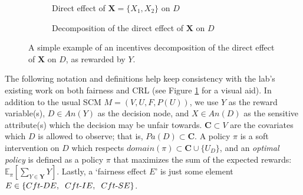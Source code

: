 \documentclass[letterpaper,10pt]{article}
\begin{document}
\begin{figure}
\centering
\begin{subfigure}{.5\textwidth}
  \centering
  \caption{Direct effect of $\mathbf{X}=\{X_1,X_2\}$ on $D$}
  \label{fig:direct}
\end{subfigure}%
\begin{subfigure}{.5\textwidth}
  \centering
  \caption{Decomposition of the direct effect of $\mathbf{X}$ on $D$}
  \label{fig:decomp}
\end{subfigure}
\caption{A simple example of an incentives decomposition of the direct effect of $\mathbf{X}$ on $D$, as rewarded by $Y$.}
\label{fig:simple}
\end{figure}

The following notation and definitions help keep consistency with the lab's existing work on both fairness\cite{r30} and CRL \cite{r57} (see Figure \ref{fig:direct} for a visual aid). In addition to the usual SCM $M=(V,U,F,P(U))$, we use $Y$ as the reward variable(s), $D\in An(Y)$ as the decision node, and $X\in An(D)$ as the sensitive attribute(s) which the decision may be unfair towards. $\mathbf{C}\subset V$ are the covariates which $D$ is allowed to observe; that is, $Pa(D)\subset \mathbf{C}$. A policy $\pi$ is a soft intervention on $D$ which respects $domain(\pi)\subset \mathbf{C}\cup \{U_D\}$, and an \emph{optimal policy} is defined as a policy $\pi$ that maximizes the sum of the expected rewards: $\mathbb{E}_\pi [\sum_{Y\in\mathbf{Y}}Y]$.
Lastly, a `fairness effect $E$' is just some element $E\in\{Cft{\text -}DE,\hspace{2mm} Cft{\text -}IE,\hspace{2mm} Cft{\text -}SE\}$.
\end{document}
